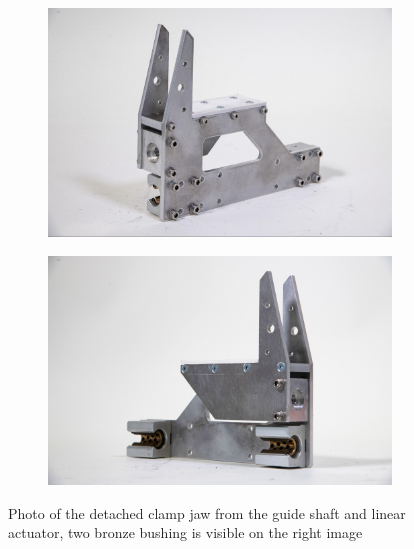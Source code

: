 \begin{figure}
    \centering
    \begin{subfigure}[b]{0.49\textwidth}
        \centering
        \includegraphics[width=\textwidth]{images/04-3/cl1-jaw-left.jpg}
    \end{subfigure}
    \hfill
    \begin{subfigure}[b]{0.49\textwidth}
        \centering
        \includegraphics[width=\textwidth]{images/04-3/jaw-right.jpg}
    \end{subfigure}
    \caption[Photo of the detached clamp jaw from the guide shaft and linear actuator]
    {Photo of the detached clamp jaw from the guide shaft and linear actuator, two bronze bushing is visible on the right image}
    \label{fig:cl1-clamp-jaw}
\end{figure}

